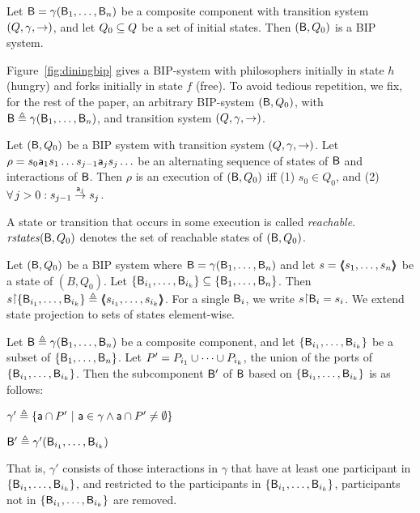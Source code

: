 \begin{definition}\label{def.bip.system} Let $\B = \gamma(\B_1,\dots,\B_n)$ be a composite component with transition system $(Q,\gamma,
\goestog)$, and let $Q_0 \sub Q$ be a set of initial states. Then
$(\B,Q_0)$ is a BIP system.  
\end{definition}

\noindent
Figure~\ref{fig:diningbip} gives a BIP-system with philosophers initially in state $h$ (hungry) and forks initially in
state $f$ (free).
%
To avoid tedious repetition, we fix, for the rest of the paper, an arbitrary BIP-system $(\B, Q_0)$, with
$\B \df \gamma(\B_1,\dots,\B_n)$, and transition system $(Q,\gamma, \goestog)$.

\begin{definition}[Execution]\label{def.bip.execution} Let $(\B, Q_0)$ be a BIP system
with transition system $(Q,\gamma, \goestog)$.  Let $\rho = s_0 \act_1 s_1 \ldots s_{j-1} \act_j s_j \ldots$ be an alternating sequence of
states of $\B$ and interactions of $\B$. Then $\rho$ is an execution of
$(\B, Q_0)$ iff (1) $s_0 \in Q_0$, and (2) $\fa j > 0: s_{j-1} \goesto[\act_j] s_j$. 
\end{definition}

\begin{definition}\label{def.bip.reachable}
A state or transition that occurs in some execution is called \emph{reachable}.
$\rstates{\B,Q_0}$ denotes the set of reachable states of $(\B, Q_0)$.
\end{definition}


\begin{definition}\label{def.bip.state.projection} Let $(\B, Q_0)$ be a BIP system where $\B = \gamma(\B_1,\dots,\B_n)$ and let
$s = \tpl{s_1,\dots,s_n}$ be a state of $(B, Q_0)$. Let $\set{\B_{i_1},\dots,\B_{i_k}} \sub \set{\B_1,\dots,\B_n}$. Then
$s \pj \set{\B_{i_1},\dots,\B_{i_k}} \df \tpl{s_{i_1},\dots,s_{i_k}}$. For a single $\B_i$, we write $s \pj \B_i = s_i$.
%
We extend state projection to sets of states element-wise.
\end{definition}

\begin{definition}[Subcomponent]\label{def.bip.subcomponent} Let $\B \df \gamma(\B_1,\dots,\B_n)$ be a composite component, and let $\set{\B_{i_1},\dots,\B_{i_k}}$
be a subset of $\set{\B_{1},\dots,\B_{n}}$.  Let $P' = P_{i_1} \un \cdots \un P_{i_k}$, \ie the union of the ports of $\set{\B_{i_1},\dots,\B_{i_k}}$.
Then the subcomponent $\B'$ of $\B$ based on $\set{\B_{i_1},\dots,\B_{i_k}}$ is as follows:
%
\bn
\item $\gamma' \df \set{ \act \ints P' \st \act \in \gamma \land \act \ints P' \ne \emptyset}$
\item $\B' \df \gamma'(\B_{i_1},\dots,\B_{i_k})$ 
\en
\end{definition}
%
That is, $\gamma'$ consists of those interactions in $\gamma$ that have at least one participant in 
$\set{\B_{i_1},\dots,\B_{i_k}}$, and restricted to the participants in $\set{\B_{i_1},\dots,\B_{i_k}}$,
\ie participants not in $\set{\B_{i_1},\dots,\B_{i_k}}$ are removed.


